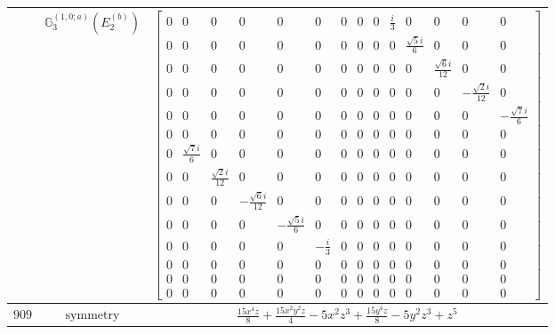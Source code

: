 \documentclass[fleqn,8pt,landscape]{jsarticle}
\begin{document}
\begin{longtable}{ccc}
$  $ & $ \mathbb{G}_{3}^{(1,0;a)}(E_{2}^{(b)}) $ & $ \begin{bmatrix} 0 & 0 & 0 & 0 & 0 & 0 & 0 & 0 & 0 & \frac{i}{3} & 0 & 0 & 0 & 0 \\ 0 & 0 & 0 & 0 & 0 & 0 & 0 & 0 & 0 & 0 & \frac{\sqrt{5} i}{6} & 0 & 0 & 0 \\ 0 & 0 & 0 & 0 & 0 & 0 & 0 & 0 & 0 & 0 & 0 & \frac{\sqrt{6} i}{12} & 0 & 0 \\ 0 & 0 & 0 & 0 & 0 & 0 & 0 & 0 & 0 & 0 & 0 & 0 & - \frac{\sqrt{2} i}{12} & 0 \\ 0 & 0 & 0 & 0 & 0 & 0 & 0 & 0 & 0 & 0 & 0 & 0 & 0 & - \frac{\sqrt{7} i}{6} \\ 0 & 0 & 0 & 0 & 0 & 0 & 0 & 0 & 0 & 0 & 0 & 0 & 0 & 0 \\ 0 & \frac{\sqrt{7} i}{6} & 0 & 0 & 0 & 0 & 0 & 0 & 0 & 0 & 0 & 0 & 0 & 0 \\ 0 & 0 & \frac{\sqrt{2} i}{12} & 0 & 0 & 0 & 0 & 0 & 0 & 0 & 0 & 0 & 0 & 0 \\ 0 & 0 & 0 & - \frac{\sqrt{6} i}{12} & 0 & 0 & 0 & 0 & 0 & 0 & 0 & 0 & 0 & 0 \\ 0 & 0 & 0 & 0 & - \frac{\sqrt{5} i}{6} & 0 & 0 & 0 & 0 & 0 & 0 & 0 & 0 & 0 \\ 0 & 0 & 0 & 0 & 0 & - \frac{i}{3} & 0 & 0 & 0 & 0 & 0 & 0 & 0 & 0 \\ 0 & 0 & 0 & 0 & 0 & 0 & 0 & 0 & 0 & 0 & 0 & 0 & 0 & 0 \\ 0 & 0 & 0 & 0 & 0 & 0 & 0 & 0 & 0 & 0 & 0 & 0 & 0 & 0 \\ 0 & 0 & 0 & 0 & 0 & 0 & 0 & 0 & 0 & 0 & 0 & 0 & 0 & 0 \end{bmatrix} $ \\ \hline
$ 909 $ & $ \text{symmetry} $ & $ \frac{15 x^{4} z}{8} + \frac{15 x^{2} y^{2} z}{4} - 5 x^{2} z^{3} + \frac{15 y^{4} z}{8} - 5 y^{2} z^{3} + z^{5} $ \\

\end{longtable}
\end{document}
